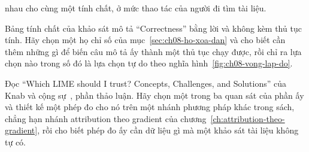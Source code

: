 \begin{cauhoids}
  nhau cho cùng một tính chất, ở mức thao tác của người đi tìm tài liệu.
  \item Bảng tính chất của khảo sát mô tả \enquote{Correctness} bằng lời và không
  kèm thủ tục tính. Hãy chọn một họ chỉ số của
  mục~\ref{sec:ch08-ho-xoa-dan} và cho biết cần thêm những gì để biến câu mô tả
  ấy thành một thủ tục chạy được, rồi chỉ ra lựa chọn nào trong số đó là lựa
  chọn tự do theo nghĩa hình~\ref{fig:ch08-vong-lap-do}.
  \item Đọc \enquote{Which LIME should I trust? Concepts, Challenges, and
  Solutions} của Knab và cộng sự~\autocite{p22whichlime}, phần thảo luận. Hãy
  chọn một trong ba quan sát của phần ấy và thiết kế một phép đo cho nó trên
  một nhánh phương pháp khác trong sách, chẳng hạn nhánh attribution theo
  gradient của chương~\ref{ch:attribution-theo-gradient}, rồi cho biết phép đo
  ấy cần dữ liệu gì mà một khảo sát tài liệu không tự có.
\end{cauhoids}
